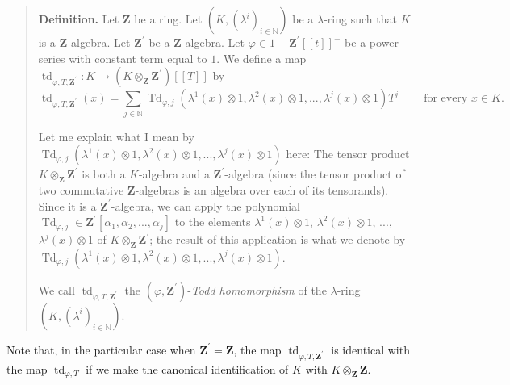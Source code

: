 \documentclass[numbers=enddot,12pt,final,onecolumn,notitlepage]{scrartcl}%
\begin{document}
\begin{quote}
\textbf{Definition.} Let $\mathbf{Z}$ be a ring. Let $\left(  K,\left(
\lambda^{i}\right)  _{i\in\mathbb{N}}\right)  $ be a $\lambda$-ring such that
$K$ is a $\mathbf{Z}$-algebra. Let $\mathbf{Z}^{\prime}$ be a $\mathbf{Z}%
$-algebra. Let $\varphi\in1+\mathbf{Z}^{\prime}\left[  \left[  t\right]
\right]  ^{+}$ be a power series with constant term equal to $1$. We define a
map $\operatorname*{td}\nolimits_{\varphi,T,\mathbf{Z}^{\prime}}%
:K\rightarrow\left(  K\otimes_{\mathbf{Z}}\mathbf{Z}^{\prime}\right)  \left[
\left[  T\right]  \right]  $ by%
\begin{equation}
\operatorname*{td}\nolimits_{\varphi,T,\mathbf{Z}^{\prime}}\left(  x\right)
=\sum\limits_{j\in\mathbb{N}}\operatorname*{Td}\nolimits_{\varphi,j}\left(
\lambda^{1}\left(  x\right)  \otimes1,\lambda^{2}\left(  x\right)
\otimes1,...,\lambda^{j}\left(  x\right)  \otimes1\right)  T^{j}%
\ \ \ \ \ \ \ \ \ \ \text{for every }x\in K. \label{ToddDefZ'}%
\end{equation}


Let me explain what I mean by $\operatorname*{Td}\nolimits_{\varphi,j}\left(
\lambda^{1}\left(  x\right)  \otimes1,\lambda^{2}\left(  x\right)
\otimes1,...,\lambda^{j}\left(  x\right)  \otimes1\right)  $ here: The tensor
product $K\otimes_{\mathbf{Z}}\mathbf{Z}^{\prime}$ is both a $K$-algebra and a
$\mathbf{Z}^{\prime}$-algebra (since the tensor product of two commutative
$\mathbf{Z}$-algebras is an algebra over each of its tensorands). Since it is
a $\mathbf{Z}^{\prime}$-algebra, we can apply the polynomial
$\operatorname*{Td}\nolimits_{\varphi,j}\in\mathbf{Z}^{\prime}\left[
\alpha_{1},\alpha_{2},...,\alpha_{j}\right]  $ to the elements $\lambda
^{1}\left(  x\right)  \otimes1$, $\lambda^{2}\left(  x\right)  \otimes1$,
$...$, $\lambda^{j}\left(  x\right)  \otimes1$ of $K\otimes_{\mathbf{Z}%
}\mathbf{Z}^{\prime}$; the result of this application is what we denote by
$\operatorname*{Td}\nolimits_{\varphi,j}\left(  \lambda^{1}\left(  x\right)
\otimes1,\lambda^{2}\left(  x\right)  \otimes1,...,\lambda^{j}\left(
x\right)  \otimes1\right)  $.

We call $\operatorname*{td}\nolimits_{\varphi,T,\mathbf{Z}^{\prime}}$ the
$\left(  \varphi,\mathbf{Z}^{\prime}\right)  $-\textit{Todd homomorphism} of
the $\lambda$-ring $\left(  K,\left(  \lambda^{i}\right)  _{i\in\mathbb{N}%
}\right)  $.
\end{quote}

Note that, in the particular case when $\mathbf{Z}^{\prime}=\mathbf{Z}$, the
map $\operatorname*{td}\nolimits_{\varphi,T,\mathbf{Z}^{\prime}}$ is identical
with the map $\operatorname*{td}\nolimits_{\varphi,T}$ if we make the
canonical identification of $K$ with $K\otimes_{\mathbf{Z}}\mathbf{Z}$.
\end{document}
